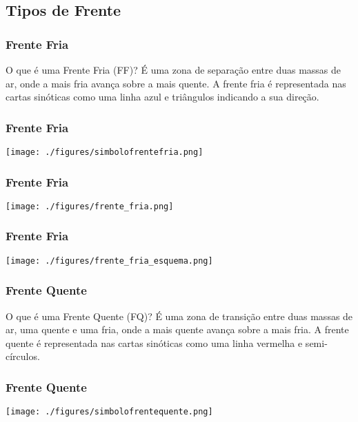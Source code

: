 \subsection{Tipos de Frente}
\begin{frame}
\frametitle{Frente Fria}
\begin{block}{O que é uma Frente Fria (FF)?}
  É uma zona de separação entre duas massas de ar, onde a mais fria avança
  sobre a mais quente.  A frente fria é representada nas cartas sinóticas como
  uma linha azul e triângulos indicando a sua direção.
\end{block}
\end{frame}

\begin{frame}
\frametitle{Frente Fria}
  \begin{center}
    \texttt{[image: ./figures/simbolofrentefria.png]}
  \end{center}
\end{frame}

\begin{frame}
\frametitle{Frente Fria}
  \begin{center}
    \texttt{[image: ./figures/frente\_fria.png]}
  \end{center}
\end{frame}

\begin{frame}
\frametitle{Frente Fria}
  \begin{center}
    \texttt{[image: ./figures/frente\_fria\_esquema.png]}
  \end{center}
\end{frame}

\begin{frame}
\frametitle{Frente Quente}
\begin{block}{O que é uma Frente Quente (FQ)?}
  É uma zona de transição entre duas massas de ar, uma quente e uma fria, onde
  a mais quente avança sobre a mais fria.  A frente quente é representada nas
  cartas sinóticas como uma linha vermelha e semi-círculos.
\end{block}
\end{frame}

\begin{frame}
\frametitle{Frente Quente}
  \begin{center}
    \texttt{[image: ./figures/simbolofrentequente.png]}
  \end{center}
\end{frame}


